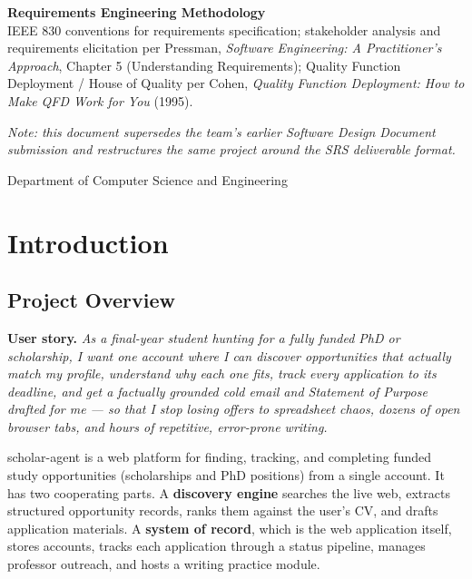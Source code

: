 \documentclass[11pt,a4paper]{article}
\begin{document}
\vspace{10pt}
{\bfseries\color{ewublue} Requirements Engineering Methodology}\\[4pt]
\noindent IEEE 830 conventions for requirements specification; stakeholder analysis and
requirements elicitation per Pressman, \textit{Software Engineering: A Practitioner's
Approach}, Chapter 5 (Understanding Requirements); Quality Function Deployment / House of
Quality per Cohen, \textit{Quality Function Deployment: How to Make QFD Work for You} (1995).

\vspace{6pt}
{\small\itshape Note: this document supersedes the team's earlier Software Design Document
submission and restructures the same project around the SRS deliverable format.}

\vfill
\begin{center}\small Department of Computer Science and Engineering\end{center}
\newpage

\section{Introduction}

\subsection{Project Overview}
\textbf{User story.} \emph{As a final-year student hunting for a fully funded PhD or
scholarship, I want one account where I can discover opportunities that actually match my
profile, understand why each one fits, track every application to its deadline, and get a
factually grounded cold email and Statement of Purpose drafted for me --- so that I stop
losing offers to spreadsheet chaos, dozens of open browser tabs, and hours of repetitive,
error-prone writing.}

scholar-agent is a web platform for finding, tracking, and completing funded study
opportunities (scholarships and PhD positions) from a single account. It has two cooperating
parts. A \textbf{discovery engine} searches the live web, extracts structured opportunity
records, ranks them against the user's CV, and drafts application materials. A \textbf{system
of record}, which is the web application itself, stores accounts, tracks each application
through a status pipeline, manages professor outreach, and hosts a writing practice module.
\end{document}
